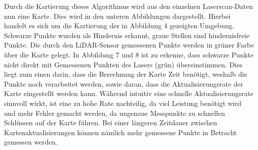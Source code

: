 {{		Durch die Kartierung dieses Algorithmus wird aus den einzelnen Laserscan-Daten nun eine Karte. Dies wird in den unteren Abbildungen dargestellt. Hierbei handelt es sich um die Kartierung der in Abbildung 4 gezeigten Umgebung. Schwarze Punkte wurden als Hindernis erkannt, graue Stellen sind hindernisfreie Punkte. Die durch den LiDAR-Sensor gemessenen Punkte werden in grüner Farbe über die Karte gelegt. In Abbildung 7 und 8 ist zu erkenne, dass schwarze Punkte nicht direkt mit Gemessenen Punkten des Lasers (grün) übereinstimmen. Dies liegt zum einen darin, dass die Berechnung der Karte Zeit benötigt, weshalb die Punkte noch verarbeitet werden, sowie daran, dass die Aktualisierungsrate der Karte eingestellt werden kann. Während intuitiv eine schnelle Aktualisierungsrate sinnvoll wirkt, ist eine zu hohe Rate nachteilig, da viel Leistung benötigt wird und mehr Fehler gemacht werden, da ungenaue Messpunkte zu schnellen Schlüssen auf der Karte führen. Bei einer längeren Zeitdauer zwischen Kartenaktualisierungen können nämlich mehr gemessene Punkte in Betracht gemessen werden.
		
}}
